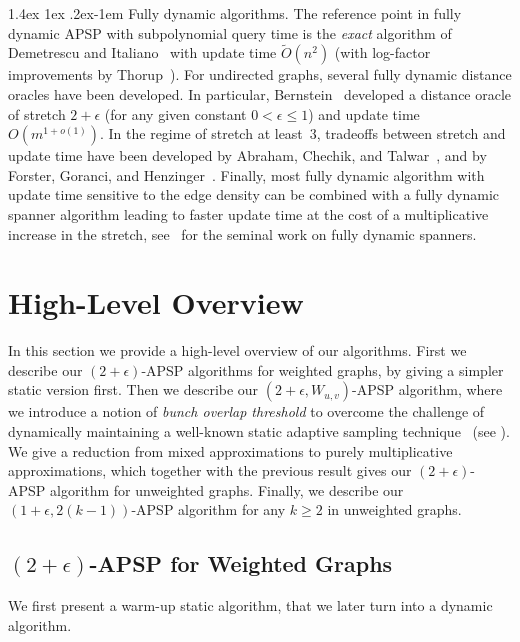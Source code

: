 \documentclass[11pt]{article}
\makeatletter
\theoremstyle{definition}
\theoremstyle{remark}
\renewcommand{\paragraph}{%
  \@startsection{paragraph}{4}%
  {\z@}{1.4ex \@plus 1ex \@minus .2ex}{-1em}%
  {\normalfont\normalsize\bfseries}%
}
\makeatother
\begin{document}
\begin{titlepage}
\paragraph{Fully dynamic algorithms.}
The reference point in fully dynamic APSP with subpolynomial query time is the \emph{exact} algorithm of Demetrescu and Italiano~\cite{DemetrescuI04} with update time $ \tilde O (n^2) $ (with log-factor improvements by Thorup~\cite{Thorup04}).
For undirected graphs, several fully dynamic distance oracles have been developed.
In particular, Bernstein~\cite{Bernstein09} developed a distance oracle of stretch $ 2 + \epsilon $ (for any given constant $ 0 < \epsilon \leq 1 $) and update time $ O (m^{1 + o(1)}) $.
In the regime of stretch at least~$ 3 $, tradeoffs between stretch and update time have been developed by Abraham, Chechik, and Talwar~\cite{AbrahamCT14}, and by Forster, Goranci, and Henzinger~\cite{ForsterGH21}.
Finally, most fully dynamic algorithm with update time sensitive to the edge density can be combined with a fully dynamic spanner algorithm leading to faster update time at the cost of a multiplicative increase in the stretch, see~\cite{BaswanaKS12} for the seminal work on fully dynamic spanners.

\section{High-Level Overview}
 In this section we provide a high-level overview of our algorithms. First we describe our $(2+\epsilon)$-APSP algorithms for weighted graphs, by giving a simpler static version first. Then we describe our $(2+\epsilon,W_{u,v})$-APSP algorithm, where we introduce a notion of \emph{bunch overlap threshold} to overcome the challenge of dynamically maintaining a well-known static adaptive sampling technique~\cite{TZ01} (see ). 
 We give a reduction from mixed approximations to purely multiplicative approximations, which together with the previous result gives our $(2+\epsilon)$-APSP algorithm for unweighted graphs. 
Finally, we describe our $(1+\epsilon, 2(k-1))$-APSP algorithm for any $k \geq 2$ in unweighted graphs. 



\subsection{\texorpdfstring{$(2+\epsilon)$}{(2+epsilon)}-APSP for Weighted Graphs}\label{sc:high-level_2approx} 
We first present a warm-up static algorithm, that we later turn into a dynamic algorithm. 


\end{titlepage}
\end{document}
